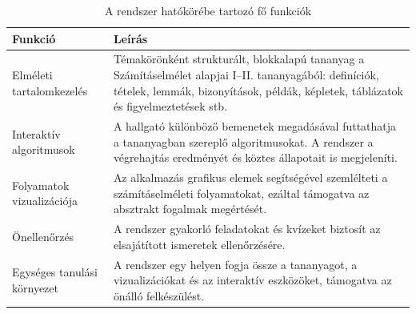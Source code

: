 \begin{table}[htbp]
      \centering 
      \begin{tabularx}{\textwidth}{|l|X|} 
            \hline 
            \textbf{Funkció} & \textbf{Leírás} \\ 
            \hline 
            Elméleti tartalomkezelés & 
                  Témakörönként strukturált, blokkalapú tananyag a Számításelmélet 
                  alapjai I--II. tananyagából: definíciók, tételek, lemmák, bizonyítások,
                  példák, képletek, táblázatok és figyelmeztetések stb. \\ \hline
            Interaktív algoritmusok &
                  A hallgató különböző bemenetek megadásával futtathatja a tananyagban szereplő algoritmusokat. 
                  A rendszer a végrehajtás eredményét és köztes állapotait is megjeleníti. \\ \hline
            Folyamatok vizualizációja &
                  Az alkalmazás grafikus elemek segítségével szemlélteti a számításelméleti folyamatokat, 
                  ezáltal támogatva az absztrakt fogalmak megértését. \\ \hline
            Önellenőrzés &
                  A rendszer gyakorló feladatokat és kvízeket biztosít az elsajátított ismeretek ellenőrzésére. \\ \hline
            Egységes tanulási környezet &
                  A rendszer egy helyen fogja össze a tananyagot, a vizualizációkat és az interaktív eszközöket, 
                  támogatva az önálló felkészülést. \\
            \hline
      \end{tabularx}
      \caption{A rendszer hatókörébe tartozó fő funkciók}
      \label{tab:in_scope}
\end{table}


\clearpage
